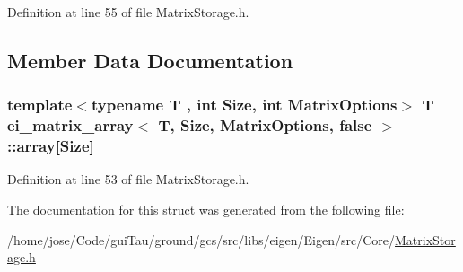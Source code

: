 Definition at line 55 of file Matrix\-Storage.\-h.



\subsection{Member Data Documentation}
\hypertarget{structei__matrix__array_3_01_t_00_01_size_00_01_matrix_options_00_01false_01_4_ab9ebb6369149c1a1da6be650e1dd57eb}{
\subsubsection[{array}]{\setlength{\rightskip}{0pt plus 5cm}template$<$typename T , int Size, int Matrix\-Options$>$ T {\bf ei\-\_\-matrix\-\_\-array}$<$ T, Size, Matrix\-Options, false $>$\-::array\mbox{[}Size\mbox{]}}}\label{structei__matrix__array_3_01_t_00_01_size_00_01_matrix_options_00_01false_01_4_ab9ebb6369149c1a1da6be650e1dd57eb}


Definition at line 53 of file Matrix\-Storage.\-h.



The documentation for this struct was generated from the following file\-:\begin{DoxyCompactItemize}
\item 
/home/jose/\-Code/gui\-Tau/ground/gcs/src/libs/eigen/\-Eigen/src/\-Core/\hyperlink{_matrix_storage_8h}{Matrix\-Storage.\-h}\end{DoxyCompactItemize}
